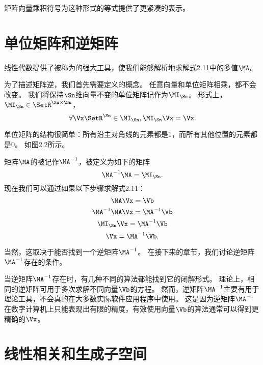 矩阵向量乘积符号为这种形式的等式提供了更紧凑的表示。





\section{单位矩阵和逆矩阵}
\label{sec:identity_and_inverse_atrices}


线性代数提供了被称为的强大工具，使我们能够解析地求解式2.11中的多值$\MA$。


为了描述矩阵逆，我们首先需要定义的概念。
任意向量和单位矩阵相乘，都不会改变。
我们将保持$\Sn$维向量不变的单位矩阵记作为$\MI_{\Sn}$。
形式上，$\MI_{\Sn}\in \SetR^{\Sn\times \Sn}$，
\begin{equation}
    \forall \Vx \SetR^{\Sn} \in \MI_{\Sn}, \MI_{\Sn} \Vx = \Vx.
\end{equation}


单位矩阵的结构很简单：所有沿主对角线的元素都是$1$，而所有其他位置的元素都是$0$。
如图2.2所示。


矩阵$\MA$的被记作$\MA^{-1}$，被定义为如下的矩阵
\begin{equation} \MA^{-1}\MA = \MI_{\Sn}. \end{equation}
现在我们可以通过如果以下步骤求解式2.11：
\begin{equation}\MA\Vx=\Vb \end{equation}
\begin{equation} \MA^{-1}\MA\Vx = \MA^{-1}\Vb \end{equation}
\begin{equation} \MI_{\Sn} \Vx=\MA^{-1}\Vb \end{equation}
\begin{equation} \Vx=\MA^{-1}\Vb. \end{equation}


当然，这取决于能否找到一个逆矩阵$\MA^{-1}$。
在接下来的章节，我们讨论逆矩阵$\MA^{-1}$存在的条件。


当逆矩阵$\MA^{-1}$存在时，有几种不同的算法都能找到它的闭解形式。
理论上，相同的逆矩阵可用于多次求解不同向量$\Vb$的方程。
然而，逆矩阵$\MA^{-1}$主要有用于理论工具，不会真的在大多数实际软件应用程序中使用。
这是因为逆矩阵$\MA^{-1}$在数字计算机上只能表现出有限的精度，有效使用向量$\Vb$的算法通常可以得到更精确的$\Vx$。





\section{线性相关和生成子空间}
\label{sec:linear_dependence_and_span}

